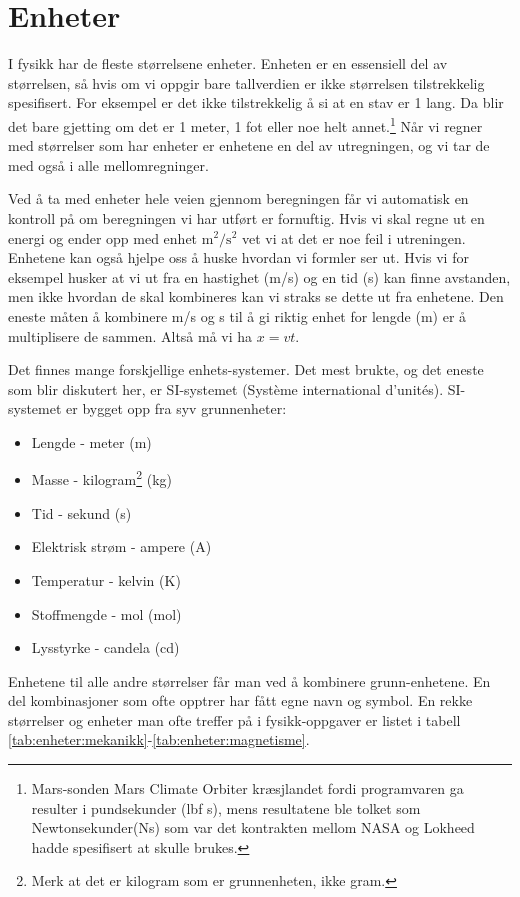 \documentclass[a4paper,norsk,12pt]{article}
\begin{document}
\section{Enheter}
I fysikk har de fleste størrelsene enheter. Enheten er en essensiell del av størrelsen, så hvis om vi oppgir bare tallverdien er ikke størrelsen tilstrekkelig spesifisert. For eksempel er det ikke tilstrekkelig å si at en stav er 1 lang. Da blir det bare gjetting om det er 1 meter, 1 fot eller noe helt annet.\footnote{Mars-sonden Mars Climate Orbiter kræsjlandet fordi programvaren ga resulter i pundsekunder (lbf s), mens resultatene ble tolket som Newtonsekunder(Ns) som var det kontrakten mellom NASA og Lokheed hadde spesifisert at skulle brukes.} Når vi regner med størrelser som har enheter er enhetene en del av utregningen, og vi tar de med også i alle mellomregninger.

Ved å ta med enheter hele veien gjennom beregningen får vi automatisk en kontroll på om beregningen vi har utført er fornuftig. Hvis vi skal regne ut en energi og ender opp med enhet $\mathrm{m^2/s^2}$ vet vi at det er noe feil i utreningen. Enhetene kan også hjelpe oss å huske hvordan vi formler ser ut. Hvis vi for eksempel husker at vi ut fra en hastighet (m/s) og en tid (s) kan finne avstanden, men ikke hvordan de skal kombineres kan vi straks se dette ut fra enhetene. Den eneste måten å kombinere m/s og s til å gi riktig enhet for lengde (m) er å multiplisere de sammen. Altså må vi ha $x = vt$.

Det finnes mange forskjellige enhets-systemer. Det mest brukte, og det eneste som blir diskutert her, er SI-systemet (Système international d'unités). SI-systemet er bygget opp fra syv grunnenheter:
\begin{itemize}
\item Lengde - meter (m)
\item Masse - kilogram\footnote{Merk at det er kilogram som er grunnenheten, ikke gram.} (kg)
\item Tid - sekund (s)
\item Elektrisk strøm - ampere (A)
\item Temperatur - kelvin (K)
\item Stoffmengde - mol (mol)
\item Lysstyrke - candela (cd)
\end{itemize}
Enhetene til alle andre størrelser får man ved å kombinere grunn-enhetene. En del kombinasjoner som ofte opptrer har fått egne navn og symbol. En rekke størrelser og enheter man ofte treffer på i fysikk-oppgaver er listet i tabell \ref{tab:enheter:mekanikk}-\ref{tab:enheter:magnetisme}.
\end{document}
